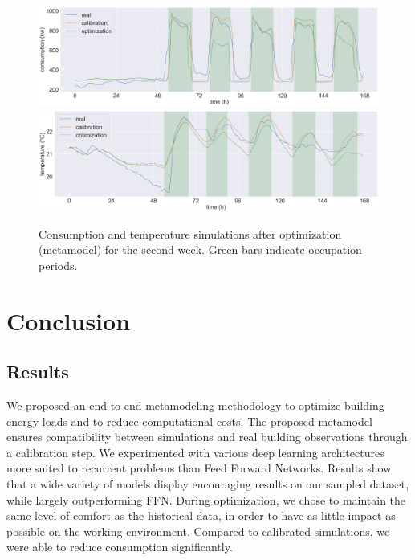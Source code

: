 \documentclass[12pt]{article}
\begin{document}
\begin{figure}
    \centering
    \includegraphics[width=\textwidth]{optim_week2_private.png}
    \includegraphics[width=\textwidth]{optim_week2_t_int.png}
    \caption{Consumption and temperature simulations after optimization (metamodel) for the second week. Green bars indicate occupation periods.} %
    \label{fig:timeseriesafteroptim}
\end{figure}

\section{Conclusion}
\subsection{Results}
We proposed an end-to-end metamodeling methodology to optimize building energy loads and to reduce computational costs. The proposed metamodel ensures compatibility between simulations and real building observations through a calibration step. We experimented with various deep learning architectures more suited to recurrent problems than Feed Forward Networks. Results show that a wide variety of models display encouraging results on our sampled dataset, while largely outperforming FFN. During optimization, we chose to maintain the same level of comfort as the historical data, in order to have as little impact as possible on the working environment. Compared to calibrated simulations, we were able to reduce consumption significantly.
\end{document}

